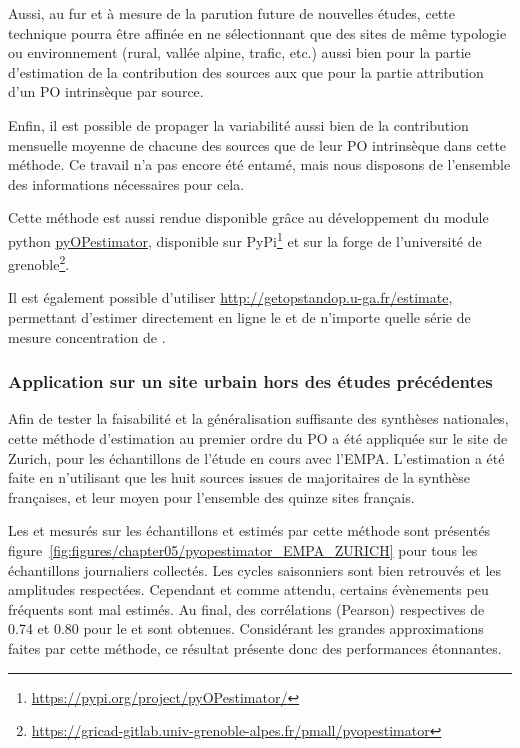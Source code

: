 Aussi, au fur et à mesure de la parution future de nouvelles études, cette technique pourra être 
affinée en ne sélectionnant que des sites de même typologie ou
environnement (rural, vallée alpine, trafic, etc.) aussi bien pour la partie d'estimation
de la contribution des sources aux \PMdix{} que pour la partie attribution d'un PO
intrinsèque par source.

Enfin, il est possible de propager la variabilité aussi bien de la contribution mensuelle
moyenne de chacune des sources que de leur PO intrinsèque dans cette méthode. Ce travail n'a
pas encore été entamé, mais nous disposons de l'ensemble des informations nécessaires pour
cela.

\begin{tcolorbox}[colback=red!5!white,colframe=Melon,title=Note]
    Cette méthode est aussi rendue disponible grâce au développement du module python
    \href{https://gricad-gitlab.univ-grenoble-alpes.fr/pmall/pyopestimator}{pyOPestimator},
    disponible sur PyPi\footnote{\url{https://pypi.org/project/pyOPestimator/}} et sur la
    forge de l'université de
    grenoble\footnote{\url{https://gricad-gitlab.univ-grenoble-alpes.fr/pmall/pyopestimator}}.

    Il est également possible d'utiliser \url{http://getopstandop.u-ga.fr/estimate},
    permettant d'estimer directement en ligne le \POAAv{} et \PODTTv{} de n'importe quelle
    série de mesure concentration de \PMdix.
\end{tcolorbox}

\subsubsection{Application sur un site urbain hors des études précédentes}

Afin de tester la faisabilité et la généralisation suffisante des synthèses nationales,
cette méthode d'estimation au premier ordre du PO a été appliquée sur le site de Zurich,
pour les échantillons de l'étude en cours avec l'EMPA. 
L'estimation a été faite en n'utilisant que les huit sources issues de majoritaires de la
synthèse françaises, et leur \OPm{} moyen pour l'ensemble des quinze sites français.

Les \POAAv{} et \PODTTv{} mesurés sur les échantillons et estimés par cette méthode sont
présentés figure~\ref{fig:figures/chapter05/pyopestimator_EMPA_ZURICH} pour tous les
échantillons journaliers collectés.  Les cycles saisonniers sont bien retrouvés et les
amplitudes respectées. Cependant et comme attendu, certains évènements peu fréquents sont
mal estimés. Au final, des corrélations (Pearson) respectives de 0.74 et 0.80 pour le
\POAAv{} et \PODTTv{} sont obtenues.  Considérant les grandes approximations faites par cette
méthode, ce résultat présente donc des performances étonnantes.

